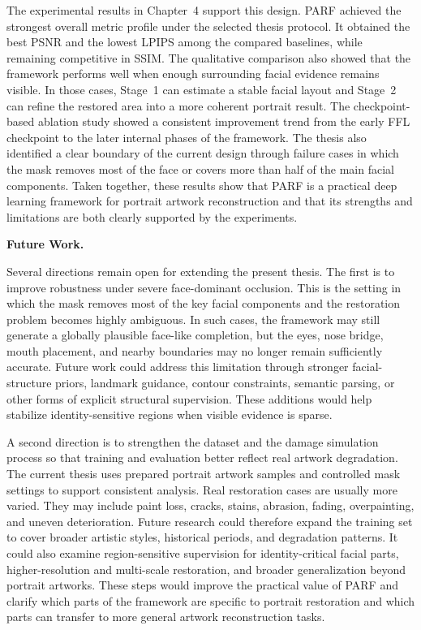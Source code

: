 \documentclass[12pt, twoside]{report}
\begin{document}
The experimental results in Chapter~4 support this design. PARF achieved the strongest overall metric profile under the selected thesis protocol. It obtained the best PSNR and the lowest LPIPS among the compared baselines, while remaining competitive in SSIM. The qualitative comparison also showed that the framework performs well when enough surrounding facial evidence remains visible. In those cases, Stage~1 can estimate a stable facial layout and Stage~2 can refine the restored area into a more coherent portrait result. The checkpoint-based ablation study showed a consistent improvement trend from the early FFL checkpoint to the later internal phases of the framework. The thesis also identified a clear boundary of the current design through failure cases in which the mask removes most of the face or covers more than half of the main facial components. Taken together, these results show that PARF is a practical deep learning framework for portrait artwork reconstruction and that its strengths and limitations are both clearly supported by the experiments.

\bigskip
\noindent\textbf{Future Work.}\par
Several directions remain open for extending the present thesis. The first is to improve robustness under severe face-dominant occlusion. This is the setting in which the mask removes most of the key facial components and the restoration problem becomes highly ambiguous. In such cases, the framework may still generate a globally plausible face-like completion, but the eyes, nose bridge, mouth placement, and nearby boundaries may no longer remain sufficiently accurate. Future work could address this limitation through stronger facial-structure priors, landmark guidance, contour constraints, semantic parsing, or other forms of explicit structural supervision. These additions would help stabilize identity-sensitive regions when visible evidence is sparse.

A second direction is to strengthen the dataset and the damage simulation process so that training and evaluation better reflect real artwork degradation. The current thesis uses prepared portrait artwork samples and controlled mask settings to support consistent analysis. Real restoration cases are usually more varied. They may include paint loss, cracks, stains, abrasion, fading, overpainting, and uneven deterioration. Future research could therefore expand the training set to cover broader artistic styles, historical periods, and degradation patterns. It could also examine region-sensitive supervision for identity-critical facial parts, higher-resolution and multi-scale restoration, and broader generalization beyond portrait artworks. These steps would improve the practical value of PARF and clarify which parts of the framework are specific to portrait restoration and which parts can transfer to more general artwork reconstruction tasks.
\end{document}
